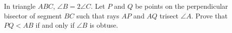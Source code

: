 In triangle $ABC$, $\angle{B}=2\angle{C}$. Let $P$ and $Q$ be points on the perpendicular bisector of segment $BC$ such that rays $AP$ and $AQ$ trisect $\angle{A}$. Prove that $PQ<AB$ if and only if $\angle{B}$ is obtuse.